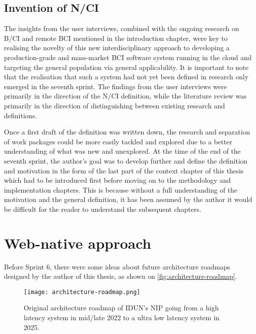 \subsection{Invention of N/CI}
\label{chapter4-invention-of-nci}

The insights from the user interviews, combined with the ongoing research on B/CI and remote BCI mentioned in the introduction chapter, were key to realising the novelty of this new interdisciplinary approach to developing a production-grade and mass-market BCI software system running in the cloud and targeting the general population via general applicability. It is important to note that the realisation that such a system had not yet been defined in research only emerged in the seventh sprint. The findings from the user interviews were primarily in the direction of the N/CI definition, while the literature review was primarily in the direction of distinguishing between existing research and definitions.

Once a first draft of the definition was written down, the research and separation of work packages could be more easily tackled and explored due to a better understanding of what was new and unexplored. At the time of the end of the seventh sprint, the author's goal was to develop further and define the definition and motivation in the form of the last part of the context chapter of this thesis which had to be introduced first before moving on to the methodology and implementation chapters. This is because without a full understanding of the motivation and the general definition, it has been assumed by the author it would be difficult for the reader to understand the subsequent chapters.

\section*{Web-native approach}
\label{chapter4-web-native-approach}

Before Sprint 6, there were some ideas about future architecture roadmaps designed by the author of this thesis, as shown on \autoref{fig:architecture-roadmap}.

\begin{figure}[!ht]
  \centering
  \texttt{[image: architecture-roadmap.png]}
  \caption{Original architecture roadmap of IDUN's NIP going from a high latency system in mid/late 2022 to a ultra low latency system in 2025.}
  \label{fig:architecture-roadmap}
\end{figure}


